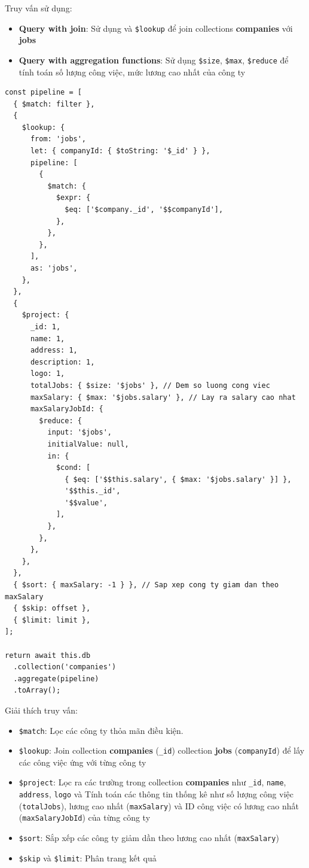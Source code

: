Truy vấn sử dụng:
\begin{itemize}
    \item \textbf{Query with join}: Sử dụng và \texttt{\$lookup} để join collections \textbf{companies} với \textbf{jobs}
    \item \textbf{Query with aggregation functions}: Sử dụng \texttt{\$size}, \texttt{\$max}, \texttt{\$reduce} để tính toán số lượng công việc, mức lương cao nhất của công ty
\end{itemize}

\begin{lstlisting}
const pipeline = [
  { $match: filter },
  {
    $lookup: {
      from: 'jobs',
      let: { companyId: { $toString: '$_id' } },
      pipeline: [
        {
          $match: {
            $expr: {
              $eq: ['$company._id', '$$companyId'],
            },
          },
        },
      ],
      as: 'jobs',
    },
  },
  {
    $project: {
      _id: 1,
      name: 1,
      address: 1,
      description: 1,
      logo: 1,
      totalJobs: { $size: '$jobs' }, // Dem so luong cong viec
      maxSalary: { $max: '$jobs.salary' }, // Lay ra salary cao nhat
      maxSalaryJobId: {
        $reduce: {
          input: '$jobs',
          initialValue: null,
          in: {
            $cond: [
              { $eq: ['$$this.salary', { $max: '$jobs.salary' }] },
              '$$this._id',
              '$$value',
            ],
          },
        },
      },
    },
  },
  { $sort: { maxSalary: -1 } }, // Sap xep cong ty giam dan theo maxSalary
  { $skip: offset },
  { $limit: limit },
];

return await this.db
  .collection('companies')
  .aggregate(pipeline)
  .toArray();
\end{lstlisting}

Giải thích truy vấn: 
\begin{itemize}
    \item \texttt{\$match}: Lọc các công ty thỏa mãn điều kiện.
    \item \texttt{\$lookup}: Join collection \textbf{companies} (\texttt{\_id}) collection \textbf{jobs} (\texttt{companyId}) để lấy các công việc ứng với từng công ty
    \item \texttt{\$project}: Lọc ra các trường trong collection \textbf{companies} như \texttt{\_id}, \texttt{name}, \texttt{address}, \texttt{logo} và Tính toán các thông tin thống kê như số lượng công việc (\texttt{totalJobs}), lương cao nhất (\texttt{maxSalary}) và ID công việc có lương cao nhất (\texttt{maxSalaryJobId}) của từng công ty
    \item \texttt{\$sort}: Sắp xếp các công ty giảm dần theo lương cao nhất (\texttt{maxSalary})
    \item \texttt{\$skip} và \texttt{\$limit}: Phân trang kết quả
\end{itemize}

